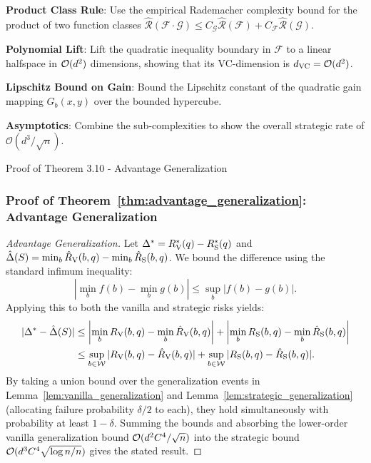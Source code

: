 \begin{guideblock}
\item \textbf{Product Class Rule}: Use the empirical Rademacher complexity bound for the product of two function classes $\hat{\mathcal{R}}(\mathcal{F}\cdot\mathcal{G}) \le C_{\mathcal{G}}\hat{\mathcal{R}}(\mathcal{F}) + C_{\mathcal{F}}\hat{\mathcal{R}}(\mathcal{G})$.
\item \textbf{Polynomial Lift}: Lift the quadratic inequality boundary in $\mathcal{F}$ to a linear halfspace in $\mathcal{O}(d^2)$ dimensions, showing that its VC-dimension is $d_{\mathrm{VC}} = \mathcal{O}(d^2)$.
\item \textbf{Lipschitz Bound on Gain}: Bound the Lipschitz constant of the quadratic gain mapping $G_b(x, y)$ over the bounded hypercube.
\item \textbf{Asymptotics}: Combine the sub-complexities to show the overall strategic rate of $\mathcal{O}(d^3/\sqrt{n})$.
\end{guideblock}


\begin{sourceblock}{Proof of Theorem 3.10 - Advantage Generalization}
\subsubsection*{Proof of Theorem~\ref{thm:advantage_generalization}: Advantage Generalization}
\label{app:proof_advantage_generalization}
\begin{proof}[Advantage Generalization]
Let $\Delta^* = R_{\mathrm{V}}^*(q) - R_{\mathrm{S}}^*(q)$ and $\hat{\Delta}(S) = \min_b \hat{R}_{\mathrm{V}}(b, q) - \min_b \hat{R}_{\mathrm{S}}(b, q)$. We bound the difference using the standard infimum inequality:
\begin{equation}
    \left| \min_{b} f(b) - \min_{b} g(b) \right| \le \sup_{b} |f(b) - g(b)|.
\end{equation}
Applying this to both the vanilla and strategic risks yields:
\begin{align}
    |\Delta^* - \hat{\Delta}(S)| &\le \left| \min_b R_{\mathrm{V}}(b, q) - \min_b \hat{R}_{\mathrm{V}}(b, q) \right| + \left| \min_b R_{\mathrm{S}}(b, q) - \min_b \hat{R}_{\mathrm{S}}(b, q) \right| \nonumber \\
    &\le \sup_{b \in \mathcal{W}} |R_{\mathrm{V}}(b, q) - \hat{R}_{\mathrm{V}}(b, q)| + \sup_{b \in \mathcal{W}} |R_{\mathrm{S}}(b, q) - \hat{R}_{\mathrm{S}}(b, q)|.
\end{align}
By taking a union bound over the generalization events in Lemma~\ref{lem:vanilla_generalization} and Lemma~\ref{lem:strategic_generalization} (allocating failure probability $\delta/2$ to each), they hold simultaneously with probability at least $1 - \delta$. Summing the bounds and absorbing the lower-order vanilla generalization bound $\mathcal{O}(d^2 C^4/\sqrt{n})$ into the strategic bound $\mathcal{O}(d^3 C^4 \sqrt{\log n / n})$ gives the stated result.
\end{proof}
\end{sourceblock}


